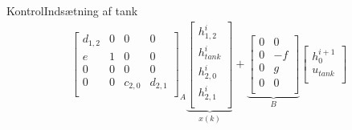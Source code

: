 \begin{frame}{Kontrol}{Indsætning af tank}
\begin{equation*}
\begin{aligned}
{\begin{bmatrix}
         d_{1,2}& 0     &0         &0 \\ %
       e    & 1     &0         &0     \\ %
          0    & 0     & 0        &0       \\ %
         0     & 0    &c_{2,0}    &  d_{2,1} \\ %
        \end{bmatrix}}_{A}
            \underbrace{\begin{bmatrix}
        h_{1,2}^{i} \\
        h_{tank}^{i}\\
        h_{2,0}^{i}\\
        h_{2,1}^{i}\\
        \end{bmatrix}}_{x(k)}
    +  \underbrace{\begin{bmatrix}
         0 & 0\\
          0& -f \\
          0& g \\ 
          0& 0 \\
        \end{bmatrix}}_{B}
        \begin{bmatrix}
        h_0^{i+1}\\
        u_{tank} \\
        \end{bmatrix}
    \end{aligned}
\end{equation*}    
\vfill \vfill
\end{frame}

